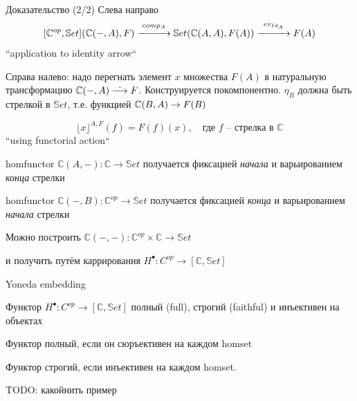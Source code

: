 \documentclass[
  russian,
  aspectratio=169,
  xcolor={svgnames},
  hyperref={colorlinks,citecolor=DeepPink4,linkcolor=DarkRed,urlcolor=DarkBlue}]{beamer}
\begin{document}
\begin{frame}[fragile]{Доказательство (2/2)}
Слева направо
$$
[\mathbb{C}^{op}, \mathbb{S}et](\mathbb{C}(-,A), F) 
  \overset{comp_A}{\xrightarrow{\hspace*{1cm}}} 
\mathbb{S}et(\mathbb{C}(A,A), F(A))
  \overset{ev_{Id_A}}{\xrightarrow{\hspace*{1cm}}} 
  F(A)
$$ 
``application to identity arrow``\\ \vspace{1cm}

Справа налево: надо перегнать элемент $x$ множества $F(A)$ в
натуральную трансформацию $\mathbb{C}(-,A)\overset{\text{\normalsize .}}\longrightarrow F$. Конструируется покомпонентно. 
$\eta_B$ должна быть стрелкой в $\mathbb{S}et$, т.е. функцией $\mathbb{C}(B,A) \rightarrow F(B)$

$$
\lfloor x\rfloor^{A, F}(f) = F(f)(x),\quad \text{где $f$  -- стрелка в~}\mathbb{C}
$$
``using functorial action`` 
\end{frame}

\begin{frame}[fragile]
homfunctor $\mathbb{C}(A,-): \mathbb{C} \rightarrow\mathbb{S}et$
получается фиксацией \emph{начала} и варьированием \emph{конца} стрелки
\vspace{0.5cm}

homfunctor $\mathbb{C}(-,B): \mathbb{C}^{op}\rightarrow\mathbb{S}et$
получается фиксацией \emph{конца} и варьированием \emph{начала} стрелки
\vspace{0.5cm}

Можно построить $\mathbb{C}(-,-): \mathbb{C}^{op}\times \mathbb{C} \rightarrow\mathbb{S}et$

и получить путём каррирования 
$H^{\bullet}: C^{op}\rightarrow [\mathbb{C}, \mathbb{S}et]$

\end{frame}

\begin{frame}[fragile]{Yoneda embedding}
\begin{lemma}%
Функтор 
$H^{\bullet}: C^{op}\rightarrow [\mathbb{C}, \mathbb{S}et]$
полный (full), строгий (faithful) и инъективен на объектах
\end{lemma}\vspace{1cm}

Функтор полный, если он сюръективен на каждом homset

Функтор строгий, если инъективен на каждом homset.\vspace{1cm}


TODO: какойнить пример
\end{frame}
\end{document}
